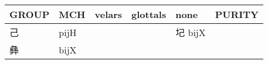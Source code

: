 \documentclass[14pt,a4paper]{scrartcl}
\begin{document}
\begin{longtable}[c]{@{}llllll@{}}
\toprule
\begin{minipage}[b]{0.14\columnwidth}\raggedright\strut
GROUP
\strut\end{minipage} &
\begin{minipage}[b]{0.14\columnwidth}\raggedright\strut
MCH
\strut\end{minipage} &
\begin{minipage}[b]{0.14\columnwidth}\raggedright\strut
velars
\strut\end{minipage} &
\begin{minipage}[b]{0.14\columnwidth}\raggedright\strut
glottals
\strut\end{minipage} &
\begin{minipage}[b]{0.14\columnwidth}\raggedright\strut
none
\strut\end{minipage} &
\begin{minipage}[b]{0.14\columnwidth}\raggedright\strut
PURITY
\strut\end{minipage}\tabularnewline
\midrule
\endhead
\begin{minipage}[t]{0.14\columnwidth}\raggedright\strut
己
\strut\end{minipage} &
\begin{minipage}[t]{0.14\columnwidth}\raggedright\strut
pijH
\strut\end{minipage} &
\begin{minipage}[t]{0.14\columnwidth}\raggedright\strut
\strut\end{minipage} &
\begin{minipage}[t]{0.14\columnwidth}\raggedright\strut
\strut\end{minipage} &
\begin{minipage}[t]{0.14\columnwidth}\raggedright\strut
圮 bijX
\strut\end{minipage} &
\begin{minipage}[t]{0.14\columnwidth}\raggedright\strut
\strut\end{minipage}\tabularnewline
\begin{minipage}[t]{0.14\columnwidth}\raggedright\strut
彝
\strut\end{minipage} &
\begin{minipage}[t]{0.14\columnwidth}\raggedright\strut
bijX
\strut\end{minipage} &
\begin{minipage}[t]{0.14\columnwidth}\raggedright\strut
\strut\end{minipage} &
\begin{minipage}[t]{0.14\columnwidth}\raggedright\strut

\end{minipage}
\end{longtable}
\end{document}
